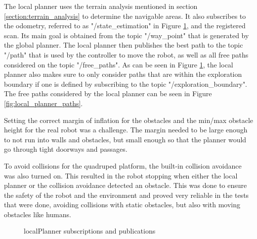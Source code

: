 \documentclass[12pt]{article}
\begin{document}
        The local planner uses the terrain analysis mentioned in section \ref{section:terrain_analysis} to determine the navigable areas. It also subscribes to the odometry, referred to as "/state\_estimation" in Figure \ref{fig:local_planner}, and the registered scan. Its main goal is obtained from the topic "/way\_point" that is generated by the global planner. The local planner then publishes the best path to the topic "/path" that is used by the controller to move the robot, as well as all free paths considered on the topic "/free\_paths". As can be seen in Figure \ref{fig:local_planner}, the local planner also makes sure to only consider paths that are within the exploration boundary if one is defined by subscribing to the topic "/exploration\_boundary". The free paths considered by the local planner can be seen in Figure \ref{fig:local_planner_paths}.

        Setting the correct margin of inflation for the obstacles and the min/max obstacle height for the real robot was a challenge. The margin needed to be large enough to not run into walls and obstacles, but small enough so that the planner would go through tight doorways and passages. 

        To avoid collisions for the quadruped platform, the built-in collision avoidance was also turned on. This resulted in the robot stopping when either the local planner or the collision avoidance detected an obstacle. This was done to ensure the safety of the robot and the environment and proved very reliable in the tests that were done, avoiding collisions with static obstacles, but also with moving obstacles like humans.
        
        \begin{figure}[h]
            \centering
            \resizebox{0.6\textwidth}{!}{%
            
            }   
            \caption{localPlanner subscriptions and publications}
            \label{fig:local_planner}
        \end{figure}
        
\end{document}
